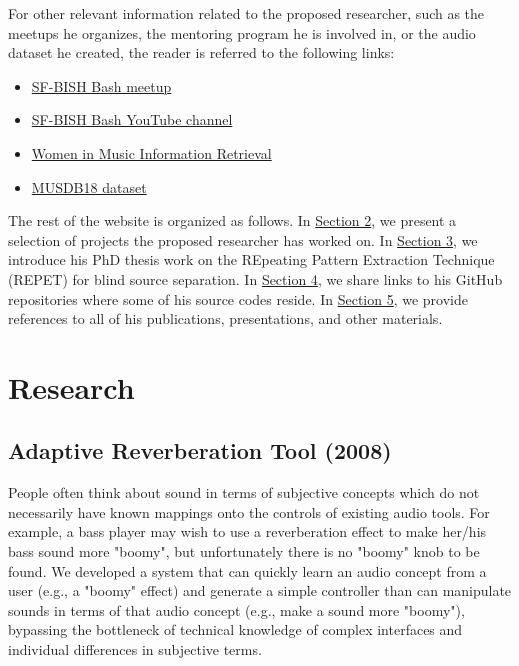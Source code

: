 \documentclass{article}
\begin{document}
For other relevant information related to the proposed researcher, such as the meetups he organizes, the mentoring program he is involved in, or the audio dataset he created, the reader is referred to the following links:
\begin{itemize}[noitemsep,topsep=0pt]
\item \href{https://www.meetup.com/bishbash/}{SF-BISH Bash meetup}
\item \href{https://www.youtube.com/channel/UCfVTmVY__IObKq06vZFryxA}{SF-BISH Bash YouTube channel}
\item \href{https://wimir.wordpress.com/}{Women in Music Information Retrieval}
\item \href{https://sigsep.github.io/datasets/musdb.html#musdb18-compressed-stems}{MUSDB18 dataset}
\end{itemize}

The rest of the website is organized as follows. In \hyperref[sec:research]{Section 2}, we present a selection of projects the proposed researcher has worked on. In \hyperref[sec:repet]{Section 3}, we introduce his PhD thesis work on the REpeating Pattern Extraction Technique (REPET) for blind source separation. In \hyperref[sec:codes]{Section 4}, we share links to his GitHub repositories where some of his source codes reside. In \hyperref[sec:refs]{Section 5}, we provide references to all of his publications, presentations, and other materials.


\section{Research}
\label{sec:research}

\subsection{Adaptive Reverberation Tool (2008)}
\label{ssec:reverb}

People often think about sound in terms of subjective concepts which do not necessarily have known mappings onto the controls of existing audio tools. For example, a bass player may wish to use a reverberation effect to make her/his bass sound more "boomy", but unfortunately there is no "boomy" knob to be found. We developed a system that can quickly learn an audio concept from a user (e.g., a "boomy" effect) and generate a simple controller than can manipulate sounds in terms of that audio concept (e.g., make a sound more "boomy"), bypassing the bottleneck of technical knowledge of complex interfaces and individual differences in subjective terms.
\end{document}
